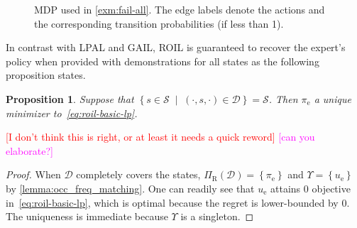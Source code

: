 \documentclass[10pt]{article}
\theoremstyle{plain}
\newtheorem{proposition}{Proposition}
\theoremstyle{remark}
\newcommand{\mm}[1]{\textcolor{magenta}{[#1]}}
\newcommand{\gersi}[1]{\textcolor{red}{[#1]}}
\begin{document}
\begin{figure}
\centering
{}
\caption{MDP used in \cref{exm:fail-all}. The edge labels denote the actions and the corresponding transition probabilities (if less than 1).}
\label{fig:example-fail-one}
\end{figure}

In contrast with LPAL and GAIL, ROIL is guaranteed to recover the expert's policy when provided with demonstrations for all states as the following proposition states.  
\begin{proposition} \label{expert_recovery}
Suppose that $\left\{ s\in \mathcal{S} \; \mid \; (\cdot,s,\cdot) \in \mathcal{D} \right\} = \mathcal{S}$. Then $\pi_{\mathrm{e}}$ a unique minimizer to~\eqref{eq:roil-basic-lp}. %
\end{proposition} \gersi{I don't think this is right, or at least it needs a quick reword} \mm{can you elaborate?}
\begin{proof}
When $\mathcal{D}$ completely covers the states, $\Pi_{\mathrm{R}}(\mathcal{D}) = \left\{ \pi_{\mathrm{e}} \right\}$ and $\Upsilon = \left\{ u_{\mathrm{e}} \right\}$ by \cref{lemma:occ_freq_matching}. One can readily see that $u_{\mathrm{e}}$ attains $0$ objective in~\eqref{eq:roil-basic-lp}, which is optimal because the regret is lower-bounded by $0$. The uniqueness is immediate because $\Upsilon$ is a singleton.
\end{proof}
\end{document}
